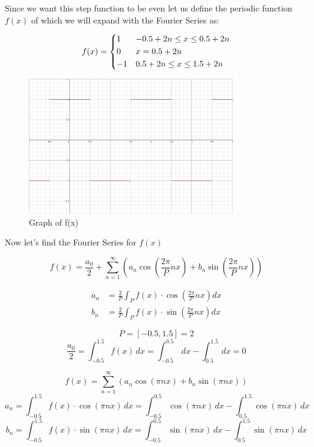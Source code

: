 \documentclass{report}
\begin{document}
Since we want this step function to be even let us define the periodic function $f(x)$ of which we will expand with the Fourier Series as:

\[ f(x) =
    \begin{dcases}
        1 & -0.5 + 2n\leq x \leq 0.5 + 2n \\
        0 & x = 0.5 + 2n \\
        -1 & 0.5 + 2n \leq x \leq 1.5 + 2n \\
    \end{dcases}
\]

\begin{figure}[H]
    \centering
    \includegraphics[width=0.8\textwidth]{images/step_function_graph.png}
    \caption{Graph of f(x)}
\end{figure}


Now let's find the Fourier Series for $f(x)$

\[f(x) = \frac{a_{0}}{2}+\sum_{n=1}^{\infty}\left(a_{n} \cos \left(\frac{2 \pi}{P} n x\right)+b_{n} \sin \left(\frac{2 \pi}{P} n x\right)\right) \]

\[\begin{aligned}
a_{n} &=\frac{2}{P} \int_{P} f(x) \cdot \cos \left(\frac{2 \pi}{P} n x\right) d x \\ 
b_{n} &=\frac{2}{P} \int_{P} f(x) \cdot \sin \left(\frac{2 \pi}{P} n x\right) d x
\end{aligned} \]

\[P = [-0.5,1.5] = 2 \]
\[ \frac{a_0}{2} = \int_{-0.5}^{1.5} f(x) \, dx = \int_{-0.5}^{0.5} \, dx  - \int_{0.5}^{1.5} \, dx = 0\] 

\[f(x) = \sum_{n=1}^{\infty}\left(a_{n} \cos \left(\pi n x\right)+b_{n} \sin \left(\pi n x\right)\right) \]
\[
a_{n} = \int_{-0.5}^{1.5} f(x) \cdot \cos \left(\pi n x\right) \, dx
= \int_{-0.5}^{0.5} \cos \left(\pi n x\right) \, dx - \int_{0.5}^{1.5} \cos \left(\pi n x\right) \, dx
\]
\[
b_{n} = \int_{-0.5}^{1.5} f(x) \cdot \sin \left(\pi n x\right) \, dx
= \int_{-0.5}^{0.5} \sin \left(\pi n x\right) \, dx - \int_{0.5}^{1.5} \sin \left(\pi n x\right) \, dx
\]
\end{document}
